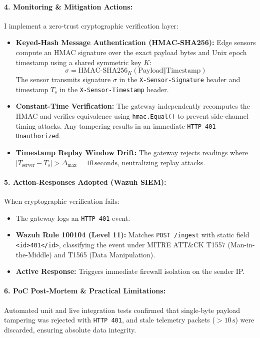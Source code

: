 \paragraph{4. Monitoring \& Mitigation Actions:}
I implement a zero-trust cryptographic verification layer:
\begin{itemize}
    \item \textbf{Keyed-Hash Message Authentication (HMAC-SHA256):} Edge sensors compute an HMAC signature over the exact payload bytes and Unix epoch timestamp using a shared symmetric key $K$:
    \begin{equation}
        \sigma = \text{HMAC-SHA256}_K(\text{Payload} \mathbin{\Vert} \text{Timestamp})
    \end{equation}
    The sensor transmits signature $\sigma$ in the \texttt{X-Sensor-Signature} header and timestamp $T_s$ in the \texttt{X-Sensor-Timestamp} header.
    \item \textbf{Constant-Time Verification:} The gateway independently recomputes the HMAC and verifies equivalence using \texttt{hmac.Equal()} to prevent side-channel timing attacks. Any tampering results in an immediate \texttt{HTTP 401 Unauthorized}.
    \item \textbf{Timestamp Replay Window Drift:} The gateway rejects readings where $|T_{\text{server}} - T_s| > \Delta_{\max} = 10\,\text{seconds}$, neutralizing replay attacks.
\end{itemize}

\paragraph{5. Action-Responses Adopted (Wazuh SIEM):}
When cryptographic verification fails:
\begin{itemize}
    \item The gateway logs an \texttt{HTTP 401} event.
    \item \textbf{Wazuh Rule 100104 (Level 11):} Matches \texttt{POST /ingest} with static field \texttt{<id>401</id>}, classifying the event under MITRE ATT\&CK T1557 (Man-in-the-Middle) and T1565 (Data Manipulation).
    \item \textbf{Active Response:} Triggers immediate firewall isolation on the sender IP.
\end{itemize}

\paragraph{6. PoC Post-Mortem \& Practical Limitations:}
Automated unit and live integration tests confirmed that single-byte payload tampering was rejected with \texttt{HTTP 401}, and stale telemetry packets ($>10\,\text{s}$) were discarded, ensuring absolute data integrity.

